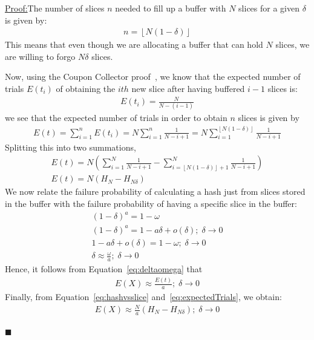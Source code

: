 \documentclass[runningheads]{llncs}
\newenvironment{claimproof}[1]{\par\noindent\underline{Proof:}\space#1}{\hfill $\blacksquare$}
\begin{document}
\begin{claimproof}
The number of slices $n$ needed to fill up a buffer with $N$ slices for a given $\delta$ is given by:
\begin{gather}
	n = \left \lfloor{N(1-\delta)}\right \rfloor  %
\end{gather}
This means that even though we are allocating a buffer that can hold $N$ slices, we are willing to forgo $N\delta$ slices.

Now, using the Coupon Collector proof~\cite{couponCollector}, we know that the expected number of trials $E(t_i)$ of obtaining the $ith$ new slice after having buffered $i-1$ slices is:\\
\begin{gather}
	E(t_i) = \frac{N}{N-(i-1)}
\end{gather}
we see that the expected number of trials in order to obtain $n$ slices is given by
\begin{gather}
	E(t) = \sum_{i=1}^{n}E(t_i) = N\sum_{i=1}^{n}\frac{1}{N-i+1} = N\sum_{i=1}^{\left \lfloor{N(1-\delta)}\right \rfloor}\frac{1}{N-i+1}
\end{gather}
Splitting this into two summations,
\begin{gather}
	E(t) = N(\sum_{i=1}^{N}\frac{1}{N-i+1} - \sum_{i=\left \lfloor{N(1-\delta)}\right \rfloor+1}^{N}\frac{1}{N-i+1}) \\
    \label{eq:expectedTrials}
    E(t) = N(H_{N} -H_{N\delta})
\end{gather}
We now relate the failure probability of calculating a hash just from slices stored in the buffer with the failure probability of having a specific slice in the buffer:
\begin{gather}
	(1-\delta)^a = 1-\omega \\
    (1-\delta)^a = 1-a\delta + o(\delta);\;\delta \to 0 \\
	1-a\delta + o(\delta) = 1-\omega;\;\delta \to 0 \\
    \label{eq:deltaomega}
	\delta \approx \frac{\omega}{a};\;\delta \to 0 
\end{gather}
Hence, it follows from Equation~\ref{eq:deltaomega} that 
\begin{gather}
	\label{eq:hashvsslice}
	E(X) \approx \frac{E(t)}{a};\;\delta \to 0 
\end{gather}
Finally, from Equation~\ref{eq:hashvsslice} and~\ref{eq:expectedTrials}, we obtain:
\begin{gather}
    \label{eq:expectedHashes}
	E(X) \approx \frac{N}{a}(H_{N} -H_{N\delta});\;\delta \to 0 
\end{gather}


\end{claimproof}
\end{document}
